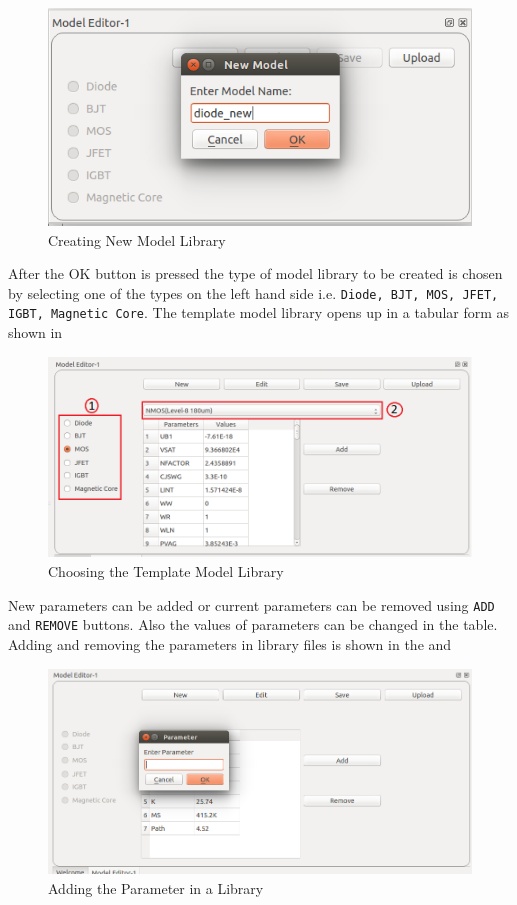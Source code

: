 \begin{figure}
\centering
\includegraphics[width =\lgfig]{modeleditor.png}
\caption{Creating New Model Library}
\label{modeleditor_new}
\end{figure}
After the OK button is pressed the type of model library to be created is chosen by selecting one of the types on the left hand side i.e.{ \tt Diode, BJT, MOS, JFET, IGBT, Magnetic Core}. The template model library opens up in a tabular form as shown in 
\begin{figure}
\centering
\includegraphics[width =\lgfig]{modelnew.png}
\caption{Choosing the Template Model Library }
\label{modelnew}
\end{figure}

\pagebreak

New parameters can be added or current parameters can be removed using {\tt ADD} and {\tt REMOVE} buttons. Also the values of parameters can be changed in the table. Adding and removing the parameters in library files is shown in the  and 

\begin{figure}
\centering
\includegraphics[width =\lgfig]{modeladd.png}
\caption{Adding the Parameter in a Library}
\label{modeladd}
\end{figure}


